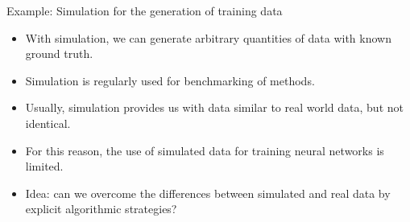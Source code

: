 \documentclass[xcolor=pdftex,dvipsnames,table]{beamer}
\begin{document}
\begin{frame}{Example: Simulation for the generation of training data}
\begin{itemize}
\item With simulation, we can generate arbitrary quantities of data with known ground truth. 
\item Simulation is regularly used for benchmarking of methods.
\item Usually, simulation provides us with data similar to real world data, but not identical. 
\item For this reason, the use of simulated data for training neural networks is limited. 
\item Idea: can we overcome the differences between simulated and real data by explicit algorithmic strategies? 
\end{itemize}
\end{frame}


\end{document}
